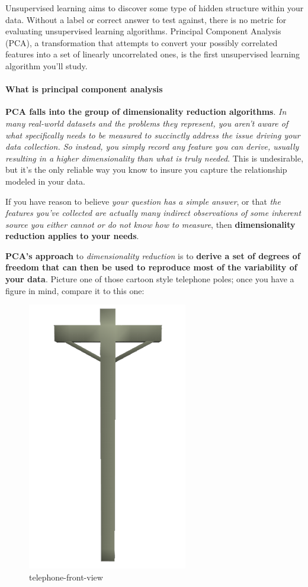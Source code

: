 \documentclass[11pt]{article}
\makeatletter
\def\maxwidth{\ifdim\Gin@nat@width>\linewidth\linewidth
    \else\Gin@nat@width\fi}
\let\Oldincludegraphics\includegraphics
\renewcommand{\includegraphics}[1]{\Oldincludegraphics[width=.8\maxwidth]{#1}}
\makeatother
\begin{document}
Unsupervised learning aims to discover some type of hidden structure
within your data. Without a label or correct answer to test against,
there is no metric for evaluating unsupervised learning algorithms.
Principal Component Analysis (PCA), a transformation that attempts to
convert your possibly correlated features into a set of linearly
uncorrelated ones, is the first unsupervised learning algorithm you'll
study.

\paragraph{What is principal component
analysis}\label{what-is-principal-component-analysis}

\textbf{PCA falls into the group of dimensionality reduction
algorithms}. \emph{In many real-world datasets and the problems they
represent, you aren't aware of what specifically needs to be measured to
succinctly address the issue driving your data collection. So instead,
you simply record any feature you can derive, usually resulting in a
higher dimensionality than what is truly needed}. This is undesirable,
but it's the only reliable way you know to insure you capture the
relationship modeled in your data.

If you have reason to believe \emph{your question has a simple answer},
or that \emph{the features you've collected are actually many indirect
observations of some inherent source you either cannot or do not know
how to measure}, then \textbf{dimensionality reduction applies to your
needs}.

\textbf{PCA's approach} to \emph{dimensionality reduction} is to
\textbf{derive a set of degrees of freedom that can then be used to
reproduce most of the variability of your data}. Picture one of those
cartoon style telephone poles; once you have a figure in mind, compare
it to this one:

\begin{figure}
\centering
\includegraphics{pic/telephone.png}
\caption{telephone-front-view}
\end{figure}
\end{document}
